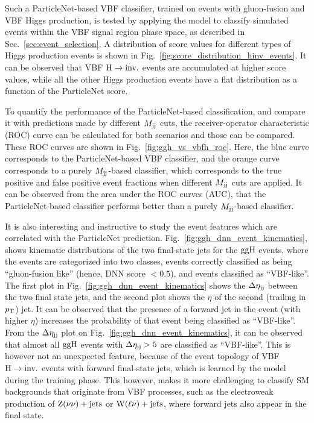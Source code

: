 Such a ParticleNet-based VBF classifier, trained on events with gluon-fusion and VBF Higgs production,
is tested by applying the model to classify simulated events within the VBF signal region phase space,
as described in Sec.~\ref{sec:event_selection}. A distribution of score values for different types of Higgs production events is shown in
Fig.~\ref{fig:score_distribution_hinv_events}. It can be observed that VBF $\textrm{H} \rightarrow \textrm{inv.}$ events are accumulated at higher score values, while all the
other Higgs production events have a flat distribution as a function of the ParticleNet score.

To quantify the performance of the ParticleNet-based classification, and compare it with predictions made by different $M_{\textrm{jj}}$ cuts, the
receiver-operator characteristic (ROC) curve can be calculated for both scenarios and those can be compared. These ROC curves are shown in
Fig.~\ref{fig:ggh_vs_vbfh_roc}. Here, the blue curve corresponds to the ParticleNet-based VBF classifier, and the orange curve corresponds
to a purely $M_{\textrm{jj}}$-based classifier, which corresponds to the true positive and false
positive event fractions when different $M_{\textrm{jj}}$ cuts are applied. It can be observed from the area under the ROC curves (AUC), 
that the ParticleNet-based classifier performs better than a purely $M_{\textrm{jj}}$-based classifier.

It is also interesting and instructive to study the event features which are correlated with the ParticleNet prediction. Fig.~\ref{fig:ggh_dnn_event_kinematics},
shows kinematic distributions of the two final-state jets for the $\mathrm{ggH}$ events, where the events are categorized into two classes, events correctly classified as
being ``gluon-fusion like'' (hence, DNN score $<0.5$), and events classified as ``VBF-like''. The first plot in Fig.~\ref{fig:ggh_dnn_event_kinematics}
shows the $\Delta \eta_{\textrm{jj}}$ between the two final state jets, and the second plot shows the $\eta$ of the second (trailing in $p_{\textrm{T}}$) jet. 
It can be observed that the presence of a forward jet in the event (with higher $\eta$) increases the probability of that event being classified as ``VBF-like''.
From the $\Delta \eta_{\textrm{jj}}$ plot on Fig.~\ref{fig:ggh_dnn_event_kinematics}, it can be observed that almost all $\mathrm{ggH}$ events with $\Delta \eta_{\textrm{jj}} > 5$ are
classified as ``VBF-like''. This is however not an unexpected feature, because of the event topology of VBF $\textrm{H} \rightarrow \textrm{inv.}$ events with forward final-state jets,
which is learned by the model during the training phase. This however, makes it more challenging to classify SM backgrounds that originate from VBF processes,
such as the electroweak production of $\textrm{Z}(\nu\nu)+\textrm{jets}$ or $\textrm{W}(\ell\nu)+\textrm{jets}$, where forward jets also appear in the final state.


